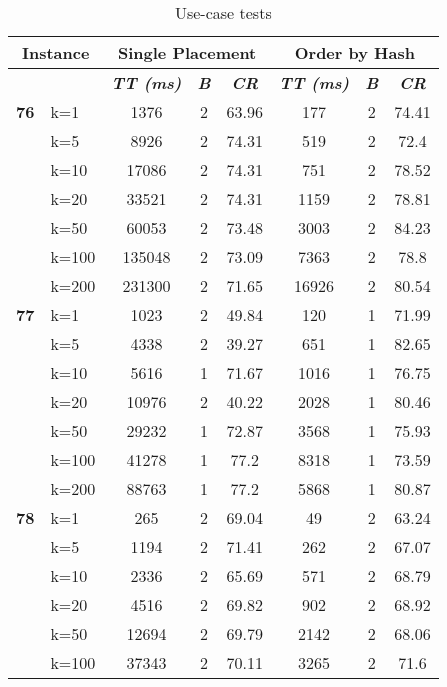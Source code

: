     \begin{table}[htbp]
    \caption{Use-case tests}
    \centering
    \begin{tabular}{|l|l|c|c|c|c|c|c|}
    
    \multicolumn{ 2}{|c|}{\textbf{Instance}} & \multicolumn{ 3}{c|}{\textbf{Single Placement}} & \multicolumn{ 3}{c|}{\textbf{Order by Hash}} \\ \hline
    \multicolumn{ 2}{|l|}{} & \textbf{\textit{TT (ms)}} & \textbf{\textit{B}} & \textbf{\textit{CR}} & \textbf{\textit{TT (ms)}} & \textbf{\textit{B}} & \textbf{\textit{CR}} \\ \hline
    \multicolumn{1}{|r|}{\textbf{76}} & k=1 & 1376 & 2 & 63.96 & 177 & 2 & 74.41 \\ 
     & k=5 & 8926 & 2 & 74.31 & 519 & 2 & 72.4 \\ 
     & k=10 & 17086 & 2 & 74.31 & 751 & 2 & 78.52 \\ 
     & k=20 & 33521 & 2 & 74.31 & 1159 & 2 & 78.81 \\ 
     & k=50 & 60053 & 2 & 73.48 & 3003 & 2 & 84.23 \\ 
     & k=100 & 135048 & 2 & 73.09 & 7363 & 2 & 78.8 \\ 
     & k=200 & 231300 & 2 & 71.65 & 16926 & 2 & 80.54 \\ \hline
    \multicolumn{1}{|r|}{\textbf{77}} & k=1 & 1023 & 2 & 49.84 & 120 & 1 & 71.99 \\ 
     & k=5 & 4338 & 2 & 39.27 & 651 & 1 & 82.65 \\ 
     & k=10 & 5616 & 1 & 71.67 & 1016 & 1 & 76.75 \\ 
     & k=20 & 10976 & 2 & 40.22 & 2028 & 1 & 80.46 \\ 
     & k=50 & 29232 & 1 & 72.87 & 3568 & 1 & 75.93 \\ 
     & k=100 & 41278 & 1 & 77.2 & 8318 & 1 & 73.59 \\ 
     & k=200 & 88763 & 1 & 77.2 & 5868 & 1 & 80.87 \\ \hline
    \multicolumn{1}{|r|}{\textbf{78}} & k=1 & 265 & 2 & 69.04 & 49 & 2 & 63.24 \\ 
     & k=5 & 1194 & 2 & 71.41 & 262 & 2 & 67.07 \\ 
     & k=10 & 2336 & 2 & 65.69 & 571 & 2 & 68.79 \\ 
     & k=20 & 4516 & 2 & 69.82 & 902 & 2 & 68.92 \\ 
     & k=50 & 12694 & 2 & 69.79 & 2142 & 2 & 68.06 \\ 
     & k=100 & 37343 & 2 & 70.11 & 3265 & 2 & 71.6 \\ 

\end{tabular}
\end{table}
